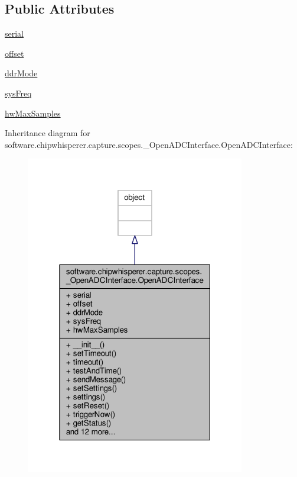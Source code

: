\subsection*{Public Attributes}
\begin{DoxyCompactItemize}
\item 
\hyperlink{classsoftware_1_1chipwhisperer_1_1capture_1_1scopes_1_1__OpenADCInterface_1_1OpenADCInterface_a1977480cbd539ad71c75f7b1f9c99af5}{serial}
\item 
\hyperlink{classsoftware_1_1chipwhisperer_1_1capture_1_1scopes_1_1__OpenADCInterface_1_1OpenADCInterface_a502fd988423826a0b3f2574d96324c31}{offset}
\item 
\hyperlink{classsoftware_1_1chipwhisperer_1_1capture_1_1scopes_1_1__OpenADCInterface_1_1OpenADCInterface_ac5e818ed51e968faffbc35028973bd4b}{ddr\+Mode}
\item 
\hyperlink{classsoftware_1_1chipwhisperer_1_1capture_1_1scopes_1_1__OpenADCInterface_1_1OpenADCInterface_af62da60e86db3b809cccce4fe3c80066}{sys\+Freq}
\item 
\hyperlink{classsoftware_1_1chipwhisperer_1_1capture_1_1scopes_1_1__OpenADCInterface_1_1OpenADCInterface_a95685bdb747786f977ef1babf288d6ea}{hw\+Max\+Samples}
\end{DoxyCompactItemize}


Inheritance diagram for software.\+chipwhisperer.\+capture.\+scopes.\+\_\+\+Open\+A\+D\+C\+Interface.\+Open\+A\+D\+C\+Interface\+:\nopagebreak
\begin{figure}[H]
\begin{center}
\leavevmode
\includegraphics[width=271pt]{de/deb/classsoftware_1_1chipwhisperer_1_1capture_1_1scopes_1_1__OpenADCInterface_1_1OpenADCInterface__inherit__graph}
\end{center}
\end{figure}



